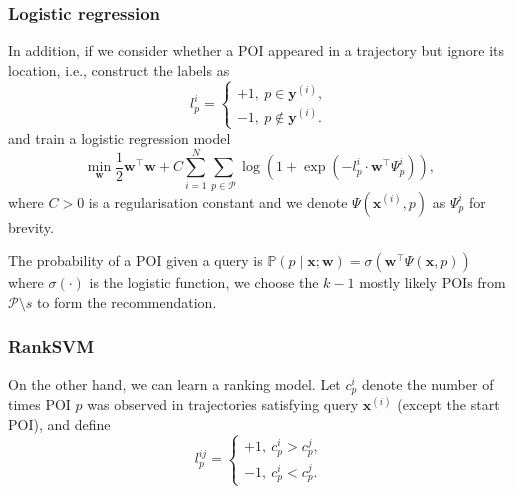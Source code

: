 \documentclass[twocolumn,9pt]{extarticle}
\begin{document}
\subsubsection{Logistic regression}
\label{sec:logistic}

In addition, if we consider whether a POI appeared in a trajectory but ignore its location, i.e., construct the labels as
\begin{equation*}
l_p^i = \begin{cases}
+1,~p \in \mathbf{y}^{(i)}, \\
-1,~p \notin \mathbf{y}^{(i)}.
\end{cases}
\end{equation*}
and train a logistic regression model 
\begin{equation*}
\min_{\mathbf{w}} \frac{1}{2} \mathbf{w}^\top \mathbf{w} + 
C \sum_{i=1}^N \sum_{p \in \mathcal{P}} \log \left(1 + \exp \left(- l_p^i \cdot \mathbf{w}^\top \Psi_p^i \right) \right),
\end{equation*}
where $C>0$ is a regularisation constant and we denote $\Psi(\mathbf{x}^{(i)}, p)$ as $\Psi_p^i$ for brevity.

The probability of a POI given a query is
$\mathbb{P}(p \mid \mathbf{x}; \mathbf{w}) = \sigma \left( \mathbf{w}^\top \Psi(\mathbf{x}, p) \right)$
where $\sigma(\cdot)$ is the logistic function, we choose the $k-1$ mostly likely POIs from $\mathcal{P} \setminus s$ 
to form the recommendation.



\subsubsection{RankSVM}
\label{sec:rank}

On the other hand, we can learn a ranking model.
Let $c_p^i$ denote the number of times POI $p$ was observed in trajectories satisfying query $\mathbf{x}^{(i)}$ (except the start POI),
and define 
\begin{equation*}
l_p^{ij} = \begin{cases}
+1,~ c_p^i > c_p^j, \\
-1,~ c_p^i < c_p^j.
\end{cases}
\end{equation*}
\end{document}

